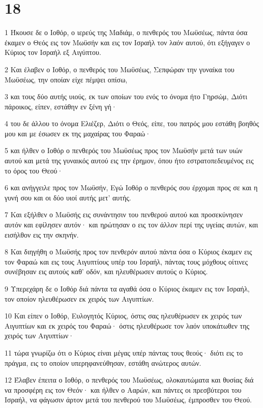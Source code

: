 \chapter{18}

\par 1 Ήκουσε δε ο Ιοθόρ, ο ιερεύς της Μαδιάμ, ο πενθερός του Μωϋσέως, πάντα όσα έκαμεν ο Θεός εις τον Μωϋσήν και εις τον Ισραήλ τον λαόν αυτού, ότι εξήγαγεν ο Κύριος τον Ισραήλ εξ Αιγύπτου.
\par 2 Και έλαβεν ο Ιοθόρ, ο πενθερός του Μωϋσέως, Σεπφώραν την γυναίκα του Μωϋσέως, την οποίαν είχε πέμψει οπίσω,
\par 3 και τους δύο αυτής υιούς, εκ των οποίων του ενός το όνομα ήτο Γηρσώμ, Διότι πάροικος, είπεν, εστάθην εν ξένη γή·
\par 4 του δε άλλου το όνομα Ελιέζερ, Διότι ο Θεός, είπε, του πατρός μου εστάθη βοηθός μου και με έσωσεν εκ της μαχαίρας του Φαραώ·
\par 5 και ήλθεν ο Ιοθόρ ο πενθερός του Μωϋσέως προς τον Μωϋσήν μετά των υιών αυτού και μετά της γυναικός αυτού εις την έρημον, όπου ήτο εστρατοπεδευμένος εις το όρος του Θεού·
\par 6 και ανήγγειλε προς τον Μωϋσήν, Εγώ Ιοθόρ ο πενθερός σου έρχομαι προς σε και η γυνή σου και οι δύο υιοί αυτής μετ' αυτής.
\par 7 Και εξήλθεν ο Μωϋσής εις συνάντησιν του πενθερού αυτού και προσεκύνησεν αυτόν και εφίλησεν αυτόν· και ηρώτησαν ο εις τον άλλον περί της υγείας αυτών, και εισήλθον εις την σκηνήν.
\par 8 Και διηγήθη ο Μωϋσής προς τον πενθερόν αυτού πάντα όσα ο Κύριος έκαμεν εις τον Φαραώ και εις τους Αιγυπτίους υπέρ του Ισραήλ, πάντας τους μόχθους οίτινες συνέβησαν εις αυτούς καθ' οδόν, και ηλευθέρωσεν αυτούς ο Κύριος.
\par 9 Υπερεχάρη δε ο Ιοθόρ διά πάντα τα αγαθά όσα ο Κύριος έκαμεν εις τον Ισραήλ, τον οποίον ηλευθέρωσεν εκ χειρός των Αιγυπτίων.
\par 10 Και είπεν ο Ιοθόρ, Ευλογητός Κύριος, όστις σας ηλευθέρωσεν εκ χειρός των Αιγυπτίων και εκ χειρός του Φαραώ· όστις ηλευθέρωσε τον λαόν υποκάτωθεν της χειρός των Αιγυπτίων·
\par 11 τώρα γνωρίζω ότι ο Κύριος είναι μέγας υπέρ πάντας τους θεούς· διότι εις το πράγμα, εις το οποίον υπερηφανεύθησαν, εστάθη ανώτερος αυτών.
\par 12 Έλαβεν έπειτα ο Ιοθόρ, ο πενθερός του Μωϋσέως, ολοκαυτώματα και θυσίας διά να προσφέρη εις τον Θεόν· και ήλθεν ο Ααρών, και πάντες οι πρεσβύτεροι του Ισραήλ, να φάγωσιν άρτον μετά του πενθερού του Μωϋσέως, έμπροσθεν του Θεού.
